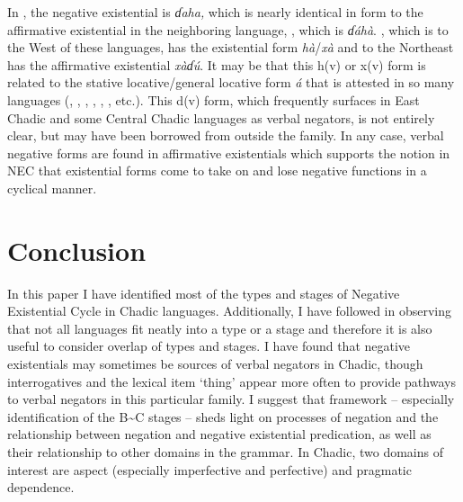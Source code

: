 \documentclass[output=paper]{langsci/langscibook}
\begin{document}
In , the negative existential is \textit{ɗaha,} which is nearly identical in form to the affirmative existential in the neighboring language, , which is \textit{ɗ\'ah\`a}. , which is to the West of these languages, has the existential form \textit{h\`a}/\textit{x\`a} and  to the Northeast has the affirmative existential \textit{x\`aɗ\'u}. It may be that this h(v) or x(v) form is related to the stative locative/general locative form \textit{\'a} that is attested in so many languages (, , , , , , etc.). This d(v) form, which frequently surfaces in East Chadic and some Central Chadic languages as verbal negators, is not entirely clear, but may have been borrowed from outside the family. In any case, verbal negative forms are found in affirmative existentials which supports the notion in NEC that existential forms come to take on and lose negative functions in a cyclical manner.
\section{Conclusion}\label{sec:3:7}

In this paper I have identified most of the types and stages of
 Negative Existential Cycle in Chadic languages.
Additionally, I have followed \citet{Veselinova2016} in observing that not
all languages fit neatly into a type or a stage and therefore it is also
useful to consider overlap of types and stages. I have found that negative
existentials may sometimes be sources of verbal negators in Chadic, though
interrogatives and the lexical item `thing' appear more often to provide
pathways to verbal negators in this particular family. I suggest that
 framework -- especially identification of the
B{\textasciitilde}C stages -- sheds light on processes of negation and the
relationship between negation and negative existential predication, as well
as their relationship to other domains in the grammar. In Chadic, two
domains of interest are aspect (especially imperfective and perfective) and
pragmatic dependence.

\end{document}

